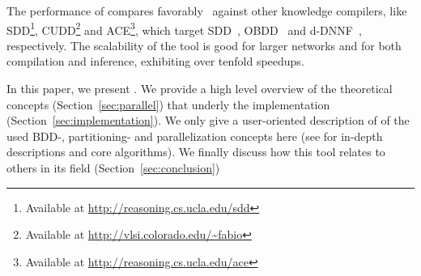 The performance of \toolname compares favorably~\cite{dal2018parallel} against other knowledge compilers, like  SDD\footnote{Available at \url{http://reasoning.cs.ucla.edu/sdd}}, CUDD\footnote{Available at \url{http://vlsi.colorado.edu/~fabio}} and ACE\footnote{Available at \url{http://reasoning.cs.ucla.edu/ace}}, which target SDD~\cite{darwiche2011sdd}, OBDD~\cite{bryant1986graph} and d-DNNF~\cite{darwiche2002knowledge}, respectively.
The scalability of the tool is good for larger networks and for both compilation and inference, exhibiting over tenfold speedups.

In this paper, we present \toolname. We provide a high level overview of the theoretical concepts (Section~\ref{sec:parallel}) that underly the implementation (Section~\ref{sec:implementation}). We only give a user-oriented description of of the used BDD-, partitioning- and parallelization concepts here (see \cite{dal2018parallel, dal2021compositional} for in-depth descriptions and core algorithms). We finally discuss how this tool relates to others in its field (Section~\ref{sec:conclusion})



